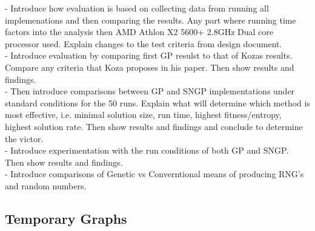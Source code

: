 \documentclass[a4paper,10.5pt]{article}
\begin{document}
- Introduce how evaluation is based on collecting data from running all implemenations and then comparing the results. Any part where running time factors into the analysis then AMD Athlon X2 5600+ 2.8GHz Dual core processor used. Explain changes to the test criteria from design document.\\
- Introduce evaluation by comparing first GP resulst to that of Kozas results. Compare any criteria that Koza proposes in his paper. Then show results and findings.\\
- Then introduce comparisons between GP and SNGP implementations under standard conditions for the 50 runs. Explain what will determine which method is most effective, i.e. minimal solution size, run time, highest fitness/entropy, highest solution rate. Then show results and findings and conclude to determine the victor.\\
- Introduce experimentation with the run conditions of both GP and SNGP. Then show results and findings.\\
- Introduce comparisons of Genetic vs Converntional means of producing RNG's and random numbers.\\

\subsection{Temporary Graphs}
\end{document}

